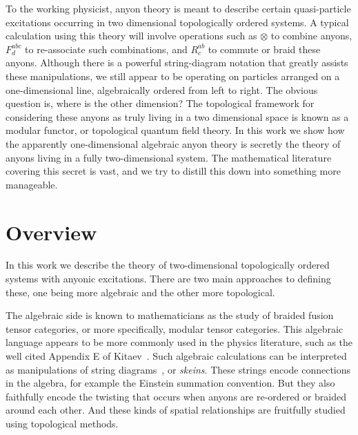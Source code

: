%
%


To the working physicist, anyon theory is meant to describe
certain quasi-particle excitations occurring in two dimensional
topologically ordered systems. 
A typical calculation using this theory will involve operations
such as $\otimes$ to combine anyons, 
$F^{abc}_{d}$ to re-associate such combinations,
and $R^{ab}_c$ to commute or braid these anyons. 
Although there is a powerful string-diagram notation that greatly assists these
manipulations, we still appear to be operating on particles
arranged on a one-dimensional line, algebraically ordered from left to right.
The obvious question is, where is the other dimension?
The topological framework for considering these anyons as truly living in a 
two dimensional space is known as a modular functor, or topological
quantum field theory. 
In this work we show how the apparently one-dimensional algebraic anyon theory
is secretly the theory of anyons living in a fully two-dimensional system.
The mathematical literature covering this secret is vast, 
and we try to distill this down into something more manageable.


\section{Overview}

In this work we describe the theory of two-dimensional topologically ordered systems
with anyonic excitations. 
There are two main approaches to defining these,
one being more algebraic and the other more topological.

The algebraic side is known to mathematicians as the study of braided
fusion tensor categories, or more specifically, modular tensor categories.
This algebraic language appears to be more commonly used 
in the physics literature, such as the well cited Appendix E of Kitaev~\cite{Kitaev2006}.
Such algebraic calculations can be interpreted as
manipulations of string diagrams~\cite{Baez2010},
or \emph{skeins}.
These strings encode connections in the algebra, for example 
the Einstein summation convention. But they also faithfully
encode the twisting that occurs when anyons are re-ordered or
braided around each other. And these kinds of spatial relationships
are fruitfully studied using topological methods.

